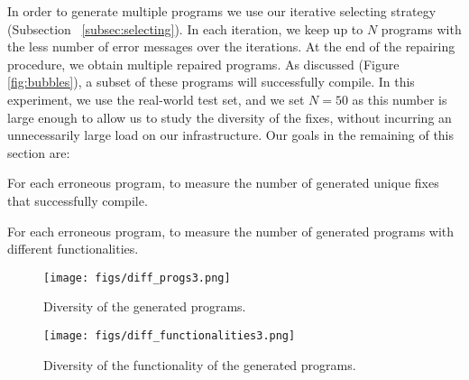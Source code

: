 \documentclass[runningheads]{llncs}
\newcommand{\samplefix}{SampleFix}
\newcommand{\dssmaplefix}{DS-SampleFix}
\newcommand{\figref}{Figure}
\begin{document}
In order to generate multiple programs we use our iterative selecting strategy (Subsection ~\ref{subsec:selecting}).
In each iteration, we keep up to $N$ programs with the less number of error messages over the iterations. At the end of the repairing procedure, we obtain multiple repaired programs. As discussed (\figref \,\ref{fig:bubbles}), a subset of these programs will successfully compile. In this experiment, we use the real-world test set, and we set $N = 50$ as this number is large enough to allow us to study the diversity of the fixes, without incurring an unnecessarily large load on our infrastructure. Our goals in the remaining of this section are: \begin{enumerate*}
    \item For each erroneous program, to measure the number of  generated unique fixes that successfully compile.
    \item For each erroneous program, to measure the number of generated programs with different functionalities.
\end{enumerate*}  


\begin{figure*}
	\centering
	    \centering
	    
	    \begin{subfigure}[b]{0.49\textwidth}
	    \centering
		\texttt{[image: figs/diff\_progs3.png]}
		\caption{Diversity of the generated programs.}
		\label{fig:diff-prog}
		\vspace{.4cm}
    	\end{subfigure} \hfill
    	\begin{subfigure}[b]{0.49\textwidth}
    	    \centering
    		\texttt{[image: figs/diff\_functionalities3.png]} 
    		\caption{Diversity of the functionality of the generated programs.}
    		\label{fig:diff-func}
    	\end{subfigure} 
	
	\caption{The results show the performance of Beam search (BS), \samplefix\,, \dssmaplefix\,, and \dssmaplefix\,+ BS. (a) Percentage of the number of the generated successfully compiled, unique programs for the given erroneous programs. (b) Percentage of the successfully compiled programs with different functionalities for the given erroneous programs. }
	\label{fig:func}
	\vspace{-.5cm}
\end{figure*}
\end{document}

